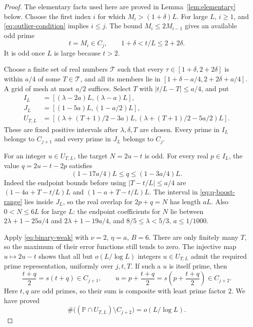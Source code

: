 \documentclass[11pt,letterpaper]{article}
\numberwithin{equation}{section}
\theoremstyle{remark}
\newcommand{\Pp}{\mathbb P}
\begin{document}
\begin{proof}
The elementary facts used here are proved in Lemma~\ref{lem:elementary}
below. Choose the first index $i$ for which $M_i>(1+\delta)L$.
For large $L$, $i\ge1$, and \eqref{eq:outlier-condition} implies $i\le j$.
The bound $M_i\le2M_{i-1}$ gives an available odd prime
\begin{equation}\label{eq:t-range}
 t=M_i\in C_j,\qquad 1+\delta<t/L\le2+2\delta.
\end{equation}
It is odd once $L$ is large because $t>2$.

Choose a finite set of real numbers $\mathcal T$ such that every
$\tau\in[1+\delta,2+2\delta]$ is within $a/4$ of some $T\in\mathcal T$,
and all its members lie in
$[1+\delta-a/4,2+2\delta+a/4]$. A grid of mesh at most $a/2$
suffices. Select $T$ with $|t/L-T|\le a/4$, and put
\begin{equation}\label{eq:boost-intervals}
 \begin{aligned}
 I_L&=[(\lambda-2a)L,(\lambda-a)L],\\
 J_L&=[(1-5a)L,(1-a/2)L],\\
 U_{T,L}&=[(\lambda+(T+1)/2-3a)L,
            (\lambda+(T+1)/2-5a/2)L].
 \end{aligned}
\end{equation}
These are fixed positive intervals after $\lambda,\delta,T$ are chosen.
Every prime in $I_L$ belongs to $C_{j+1}$ and every prime in $J_L$
belongs to $C_j$.

For an integer $u\in U_{T,L}$, the target $N=2u-t$ is odd. For every
real $p\in I_L$, the value $q=2u-t-2p$ satisfies
\begin{equation}\label{eq:q-boost-range}
 (1-17a/4)L\le q\le(1-3a/4)L.
\end{equation}
Indeed the endpoint bounds before using $|T-t/L|\le a/4$ are
$(1-4a+T-t/L)L$ and $(1-a+T-t/L)L$.
The interval in \eqref{eq:q-boost-range} lies inside $J_L$, so the
real overlap for $2p+q=N$ has length $aL$.
Also $0<N\le6L$ for large $L$: the endpoint coefficients for $N$
lie between $2\lambda+1-25a/4$ and $2\lambda+1-19a/4$,
and $8/5\le\lambda<5/3$, $a\le1/1000$.

Apply \eqref{eq:binary-weak} with $\nu=2$, $\eta=a$, $B=6$.
There are only finitely many $T$, so the maximum of their error functions
still tends to zero. The injective map $u\mapsto2u-t$ shows that all but
$o(L/\log L)$ integers $u\in U_{T,L}$ admit the required prime representation,
uniformly over $j,t,T$. If such a $u$ is itself prime, then
\begin{equation}\label{eq:boost-operations}
 \frac{t+q}{2}=s(t+q)\in C_{j+1},\qquad
 u=p+\frac{t+q}{2}=s\left(p+\frac{t+q}{2}\right)\in C_{j+2}.
\end{equation}
Here $t,q$ are odd primes, so their sum is composite with least prime
factor $2$. We have proved
\begin{equation}\label{eq:u-exceptions}
 \#\bigl((\Pp\cap U_{T,L})\setminus C_{j+2}\bigr)
       =o(L/\log L).
\end{equation}


\end{proof}
\end{document}
